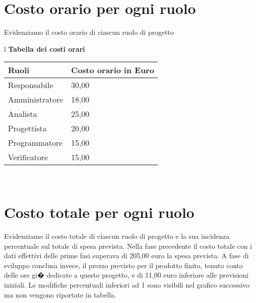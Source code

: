 \section{Costo orario per ogni ruolo}
Evidenziamo il costo orario di ciascun ruolo di progetto
\begin{table}[hbtp]
\large{
\begin{tabular}{l}
\Large{\textbf{\textsf{Tabella dei costi orari}}} \\

\begin{tabular}{||p{6cm}||p{5cm}||}
\hline
\textbf{Ruoli} & \textbf{Costo orario in Euro}\\
\hline
{Responsabile}&30,00\\ 
\hline 
{Amministratore} &18,00\\ 
\hline
{Analista} &25,00 \\
\hline
{Progettista} &20,00 \\
\hline
{Programmatore} &15,00\\
\hline
{Verificatore} &15,00 \\
\hline

\end{tabular} \\
\end{tabular}
}
\end{table}

\section{Costo totale per ogni ruolo}
Evidenziamo il costo totale di ciascun ruolo di progetto e la sua incidenza percentuale sul totale di spesa prevista. Nella fase precedente il costo totale con i dati effettivi delle prime fasi superava di 205,00 euro la spesa prevista. A fase di sviluppo conclusa invece, il prezzo previsto per il prodotto finito, tenuto conto delle ore gi� dedicate a questo progetto, e di 11,00 euro inferiore alle previsioni iniziali. Le modifiche percentuali inferiori ad 1 sono visibili nel grafico successivo ma non vengono riportate in tabella.


